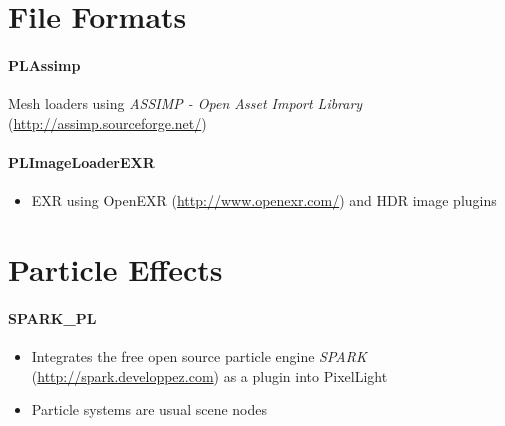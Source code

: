 \section{File Formats}


\paragraph{PLAssimp}
Mesh loaders using \emph{ASSIMP - Open Asset Import Library} (\url{http://assimp.sourceforge.net/})


\paragraph{PLImageLoaderEXR}
\begin{itemize}
\item{EXR using OpenEXR (\url{http://www.openexr.com/}) and HDR image plugins}
\end{itemize}




\section{Particle Effects}


\paragraph{SPARK\_PL}
\begin{itemize}
\item{Integrates the free open source particle engine \emph{SPARK} (\url{http://spark.developpez.com}) as a plugin into PixelLight}
\item{Particle systems are usual scene nodes}
\end{itemize}


